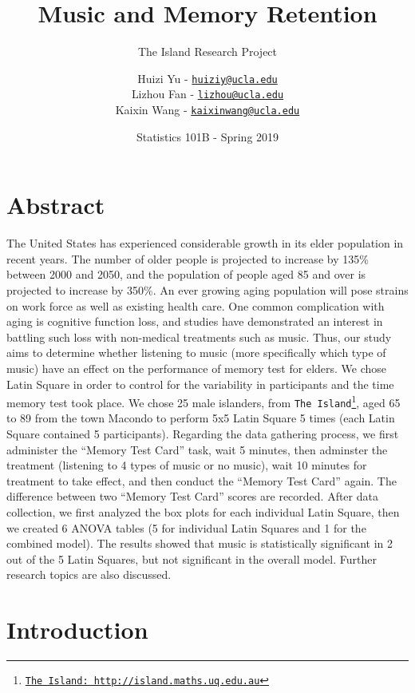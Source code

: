 \documentclass[]{article}
\title{Music and Memory Retention}
\subtitle{The Island Research Project}
\author{Huizi Yu - \href{mailto:huiziy@ucla.edu}{\nolinkurl{huiziy@ucla.edu}} \\ Lizhou Fan - \href{mailto:lizhou@ucla.edu}{\nolinkurl{lizhou@ucla.edu}} \\ Kaixin Wang -
\href{mailto:kaixinwang@ucla.edu}{\nolinkurl{kaixinwang@ucla.edu}}}
\date{Statistics 101B - Spring 2019}
\let\rmarkdownfootnote\footnote%
\def\footnote{\protect\rmarkdownfootnote}
\begin{document}
\maketitle

\begin{singlespace}
\tableofcontents
\end{singlespace}\newpage

\section{Abstract}\label{abstract}

The United States has experienced considerable growth in its elder
population in recent years. The number of older people is projected to
increase by 135\% between 2000 and 2050, and the population of people
aged 85 and over is projected to increase by 350\%. An ever growing
aging population will pose strains on work force as well as existing
health care. One common complication with aging is cognitive function
loss, and studies have demonstrated an interest in battling such loss
with non-medical treatments such as music. Thus, our study aims to
determine whether listening to music (more specifically which type of
music) have an effect on the performance of memory test for elders. We
chose Latin Square in order to control for the variability in
participants and the time memory test took place. We chose 25 male
islanders, from \texttt{The\ Island}\footnote{\href{http://island.maths.uq.edu.au}{\texttt{The\ Island:\ http://island.maths.uq.edu.au}}},
aged 65 to 89 from the town Macondo to perform 5x5 Latin Square 5 times
(each Latin Square contained 5 participants). Regarding the data
gathering process, we first administer the ``Memory Test Card'' task,
wait 5 minutes, then adminster the treatment (listening to 4 types of
music or no music), wait 10 minutes for treatment to take effect, and
then conduct the ``Memory Test Card'' again. The difference between two
``Memory Test Card'' scores are recorded. After data collection, we
first analyzed the box plots for each individual Latin Square, then we
created 6 ANOVA tables (5 for individual Latin Squares and 1 for the
combined model). The results showed that music is statistically
significant in 2 out of the 5 Latin Squares, but not significant in the
overall model. Further research topics are also discussed.

\section{Introduction}\label{introduction}
\end{document}
